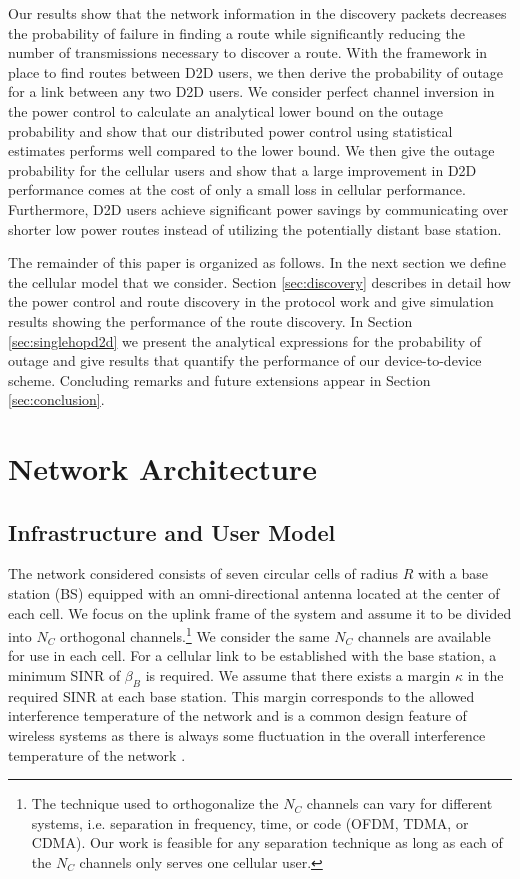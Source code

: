 \documentclass[10pt, final, journal, letterpaper,oneside, twocolumn]{IEEEtran}
\begin{document}
Our results show that the network information in the discovery packets decreases the probability of failure in finding a route while significantly reducing the number of transmissions necessary to discover a route.  With the framework in place to find routes between D2D users, we then derive the probability of outage for a link between any two D2D users.  We consider perfect channel inversion in the power control to calculate an analytical lower bound on the outage probability and show that our distributed power control using statistical estimates performs well compared to the lower bound.  We then give the outage probability for the cellular users and show that a large improvement in D2D performance comes at the cost of only a small loss in cellular performance.  Furthermore, D2D users achieve significant power savings by communicating over shorter low power routes instead of utilizing the potentially distant base station.  


The remainder of this paper is organized as follows.  In the next section we define the cellular model that we consider.  Section \ref{sec:discovery} describes in detail how the power control and route discovery in the protocol work and give simulation results showing the performance of the route discovery.  In Section \ref{sec:singlehopd2d} we present the analytical expressions for the probability of outage and give results that quantify the performance of our device-to-device scheme.  Concluding remarks and future extensions appear in Section \ref{sec:conclusion}.  








\section{Network Architecture}
\label{networkmodel}
\subsection{Infrastructure and User Model}
The network considered consists of seven circular cells of radius $R$ with a base station (BS) equipped with an omni-directional antenna located at the center of each cell.  We focus on the uplink frame of the system and assume it to be divided into $N_C$ orthogonal channels.\footnote{The technique used to orthogonalize the $N_C$  channels can vary for different systems, i.e. separation in frequency, time, or code (OFDM, TDMA, or CDMA). Our work is feasible for any separation technique as long as each of the $N_C$ channels only serves one cellular user.  } We consider the same $N_C$ channels are available for use in each cell.  For a cellular link to be established with the base station, a minimum SINR of $\beta_B$ is required.  We assume that there exists a margin $\kappa$ in the required SINR at each base station.  This margin corresponds to the allowed interference temperature of the network and is a common design feature of wireless systems as there is always some fluctuation in the overall interference temperature of the network \cite{Martin-Sacristan2009On-the-Way-Towa}.  
\end{document}
